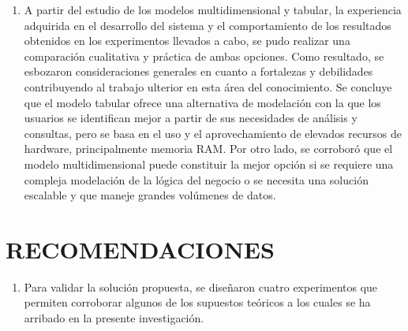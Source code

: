 \documentclass{article} %
\begin{document}
\noindent 

\begin{enumerate}
\item  A partir del estudio de los modelos multidimensional y tabular, la experiencia adquirida en el desarrollo del sistema y el comportamiento de los resultados obtenidos en los experimentos llevados a cabo, se pudo realizar una comparaci\'{o}n cualitativa y pr\'{a}ctica de ambas opciones. Como resultado, se esbozaron consideraciones generales en cuanto a fortalezas y debilidades contribuyendo al trabajo ulterior en esta \'{a}rea del conocimiento. Se concluye que el modelo tabular ofrece una alternativa de modelaci\'{o}n con la que los usuarios se identifican mejor a partir de sus necesidades de an\'{a}lisis y consultas, pero se basa en el uso y el aprovechamiento de elevados recursos de hardware, principalmente memoria RAM. Por otro lado, se corrobor\'{o} que el modelo multidimensional puede constituir la mejor opci\'{o}n si se requiere una compleja modelaci\'{o}n de la l\'{o}gica del negocio o se necesita una soluci\'{o}n escalable y que maneje grandes vol\'{u}menes de datos.
\end{enumerate}

\noindent 

\noindent 

\noindent 

\noindent 

\noindent 

\noindent 

\noindent 

\noindent 

\noindent 

\noindent 
\section{RECOMENDACIONES}

\begin{enumerate}
\item \textbf{ }Para validar la soluci\'{o}n propuesta, se dise\~{n}aron cuatro experimentos que permiten corroborar algunos de los supuestos te\'{o}ricos a los cuales se ha arribado en la presente investigaci\'{o}n. 
\end{enumerate}

\noindent 
\end{document}

